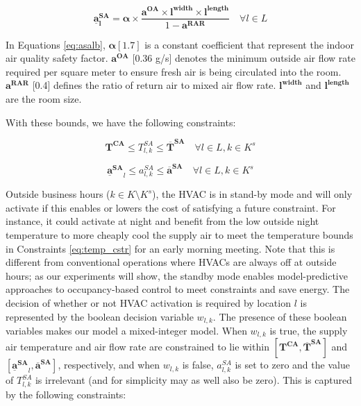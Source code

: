 \begin{equation} \label{eq:asalb}
\bm{\underline{a}_{l}^{SA}} = \bm{\alpha} \times \frac{\bm{a^{OA}} \times \bm{l^{width}} \times \bm{l^{length}}}{1-\bm{a^{RAR}}} \quad \forall l\in L
\end{equation}

\noindent In Equations \eqref{eq:asalb}, $\bm \alpha [1.7]$ is a constant coefficient that represent the indoor air quality safety factor. $\bm{a^{OA}}$ [0.36 g/s] denotes the minimum outside air flow rate required per square meter to ensure fresh air is being circulated into the room. $\bm{a^{RAR}}$ [0.4] defines the ratio of return air to mixed air flow rate. $\bm{l^{width}}$ and $\bm{l^{length}}$ are the room size. 

With these bounds, we have the following constraints:


\begin{equation} \label{eq:hvac_active_TSA}
\bm{T^{CA}} \leq T_{l,k}^{SA} \leq \bm{\overline{T}^{SA}}  \quad \forall l \in L, k\in K^s
\end{equation}

\begin{equation} \label{eq:hvac_active_ASA}
\bm{\underline{a}^{SA}}_{l} \leq a_{l,k}^{SA}  \leq \bm{\overline{a}^{SA}}   \quad \forall l \in L, k\in K^s
\end{equation}

Outside business hours ($k\in K\setminus K^s$), the HVAC is in stand-by mode and will only activate if this enables or lowers the
cost of satisfying a future constraint. For instance, it could activate at night and benefit from the low outside night temperature
to more cheaply cool the supply air to meet the temperature bounds in Constraints \eqref{eq:temp_cstr} for an early morning meeting. Note that this is different from conventional operations where HVACs are always off at outside hours; as our experiments will show, the standby mode enables
model-predictive approaches to occupancy-based control to meet constraints and save energy. The decision of whether or not HVAC
activation is required by location $l$ is represented by the boolean decision variable $w_{l,k}$. The presence of these boolean variables
makes our model a mixed-integer model. When $w_{l,k}$ is true, the supply air temperature and air flow rate are constrained to lie within
$[\bm{T^{CA}}, \bm{\overline{T}^{SA}}]$ and $[\bm{\underline{a}^{SA}}_{l},\bm{\overline{a}^{SA}}]$, respectively, and when $w_{l,k}$ is false, $a_{l,k}^{SA}$ is set to zero and the value of $T_{l,k}^{SA}$ is irrelevant (and for simplicity may as well also be zero). This is captured by the following
constraints:

